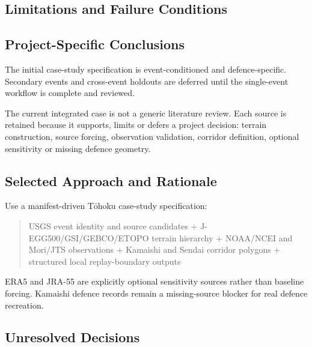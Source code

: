 
\subsection{Limitations and Failure Conditions}
\label{sec:res-dat-cas-limitations}


\subsection{Project-Specific Conclusions}
\label{sec:res-dat-cas-conclusions}

The initial case-study specification is event-conditioned and
defence-specific. Secondary events and cross-event holdouts are deferred until
the single-event workflow is complete and reviewed.

The current integrated case is not a generic literature review. Each
source is retained because it supports, limits or defers a project
decision: terrain construction, source forcing, observation validation,
corridor definition, optional sensitivity or missing defence geometry.

\subsection{Selected Approach and Rationale}
\label{sec:res-dat-cas-selected-approach}

Use a manifest-driven Tōhoku case-study specification:

\begin{quote}
  USGS event identity and source candidates
  $+$
  J-EGG500/GSI/GEBCO/ETOPO terrain hierarchy
  $+$
  NOAA/NCEI and Mori/JTS observations
  $+$
  Kamaishi and Sendai corridor polygons
  $+$
  structured local replay-boundary outputs
\end{quote}

ERA5 and JRA-55 are explicitly optional sensitivity sources rather
than baseline forcing. Kamaishi defence records remain a missing-source
blocker for real defence recreation.

\subsection{Unresolved Decisions}
\label{sec:res-dat-cas-unresolved-decisions}

